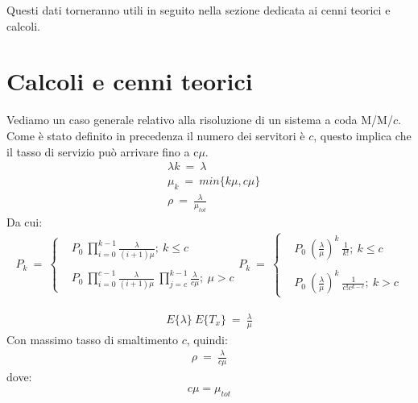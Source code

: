 \documentclass[12pt,a4paper]{article}
\begin{document}
    Questi dati torneranno utili in seguito nella sezione dedicata ai cenni teorici e calcoli. \\
\newpage
\section{Calcoli e cenni teorici}
Vediamo un caso generale relativo alla risoluzione di un sistema a coda M/M/$c$. Come è stato definito in precedenza il numero dei servitori è $c$, questo implica che il tasso di servizio può arrivare fino a c$\mu$.
    \begin{align*}
    &\lambda k \ = \ \lambda \\
    &\mu_{k} \ = \ min \{k\mu , c\mu\} \\
    &\rho \ = \ \frac{\lambda}{\mu_{tot}}
    \end{align*}
    Da cui:
    \begin{align*}
    P_{k} \ = \
    \begin{cases}
     &P_{0} \ \prod_{i = 0}^{k - 1}\frac{\lambda}{(i + 1) \mu};\ k \le c\\ \\
     &P_{0} \ \prod_{i = 0}^{c - 1}\frac{\lambda}{(i + 1) \mu}\ \prod_{j = c}^{k - 1}\frac{\lambda}{c \mu}; \ \mu > c
     \end{cases}
    P_{k} \ = \
    \begin{cases}
     &P_{0} \ (\frac{\lambda}{\mu})^{k} \ \frac{1}{k!};\ k \le c\\ \\
     &P_{0} \ (\frac{\lambda}{\mu})^{k} \ \frac{1}{c!c^{k-c}}; \ k > c
    \end{cases}
    \end{align*} 

    \begin{align*}
    E\{\lambda\} \ E\{T_{x}\} \ = \ \frac{\lambda}{\mu}
    \end{align*}
    Con massimo tasso di smaltimento $c$, quindi:
    \begin{align*}
    \rho \ = \ \frac{\lambda}{c \mu}
    \end{align*}
    dove:
    \begin{align*}
    c \mu = \mu_{tot}
    \end{align*}
\end{document}
